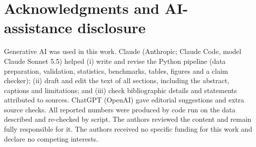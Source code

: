 \documentclass[runningheads]{llncs}
\begin{document}
\section*{Acknowledgments and AI-assistance disclosure}
Generative AI was used in this work. Claude (Anthropic; Claude Code, model Claude Sonnet 5.5) helped (i) write and revise the Python pipeline (data preparation, validation, statistics, benchmarks, tables, figures and a claim checker); (ii) draft and edit the text of all sections, including the abstract, captions and limitations; and (iii) check bibliographic details and statements attributed to sources. ChatGPT (OpenAI) gave editorial suggestions and extra source checks. All reported numbers were produced by code run on the data described and re-checked by script. The authors reviewed the content and remain fully responsible for it. The authors received no specific funding for this work and declare no competing interests.


{\let\small\footnotesize}
\end{document}
